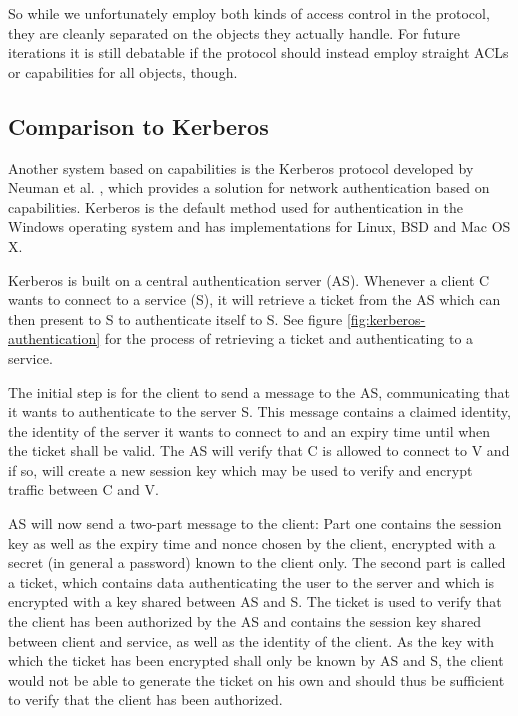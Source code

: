 So while we unfortunately employ both kinds of access control in the protocol, they are cleanly separated on the objects they actually handle.
For future iterations it is still debatable if the protocol should instead employ straight ACLs or capabilities for all objects, though.

\subsection{Comparison to Kerberos}
\label{sec:kerberos}

Another system based on capabilities is the Kerberos protocol developed by Neuman et al. \cite{neuman1994kerberos,neuman2005rfc}, which provides a solution for network authentication based on capabilities.
Kerberos is the default method used for authentication in the Windows operating system and has implementations for Linux, BSD and Mac OS X.

Kerberos is built on a central authentication server (AS).
Whenever a client C wants to connect to a service (S), it will retrieve a ticket from the AS which can then present to S to authenticate itself to S.
See figure \ref{fig:kerberos-authentication} for the process of retrieving a ticket and authenticating to a service.

The initial step is for the client to send a message to the AS, communicating that it wants to authenticate to the server S.
This message contains a claimed identity, the identity of the server it wants to connect to and an expiry time until when the ticket shall be valid.
The AS will verify that C is allowed to connect to V and if so, will create a new session key which may be used to verify and encrypt traffic between C and V.

AS will now send a two-part message to the client:
Part one contains the session key as well as the expiry time and nonce chosen by the client, encrypted with a secret (in general a password) known to the client only.
The second part is called a ticket, which contains data authenticating the user to the server and which is encrypted with a key shared between AS and S.
The ticket is used to verify that the client has been authorized by the AS and contains the session key shared between client and service, as well as the identity of the client.
As the key with which the ticket has been encrypted shall only be known by AS and S, the client would not be able to generate the ticket on his own and should thus be sufficient to verify that the client has been authorized.


